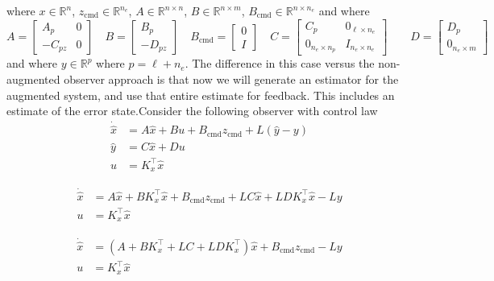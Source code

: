 where $x\in\mathbb{R}^{n}$, $z_{\text{cmd}}\in\mathbb{R}^{n_{e}}$, $A\in\mathbb{R}^{n\times n}$, $B\in\mathbb{R}^{n\times m}$, $B_{\text{cmd}}\in\mathbb{R}^{n\times n_{e}}$ and where
\begin{equation*}
  A=
  \begin{bmatrix}
    A_{p} & 0 \\
    -C_{pz} & 0
  \end{bmatrix}
  \quad
  B=
  \begin{bmatrix}
    B_{p} \\
    -D_{pz}
  \end{bmatrix}
  \quad
  B_{\text{cmd}}=
  \begin{bmatrix}
    0 \\
    I
  \end{bmatrix}
  \quad
  C=
  \begin{bmatrix}
    C_{p} & 0_{\ell\times n_{e}} \\
    0_{n_{e}\times n_{p}} & I_{n_{e}\times n_{e}}
  \end{bmatrix}
  \qquad
  D=
  \begin{bmatrix}
    D_{p} \\
    0_{n_{e}\times m}
  \end{bmatrix}
\end{equation*}
and where $y\in\mathbb{R}^{p}$ where $p=\ell+n_{e}$.
The difference in this case versus the non-augmented observer approach is that now we will generate an estimator for the augmented system, and use that entire estimate for feedback.
This includes an estimate of the error state.Consider the following observer with control law
\begin{equation*}
  \begin{split}
    \dot{\hat{x}}&=A\hat{x}+Bu+B_{\text{cmd}}z_{\text{cmd}}+L(\hat{y}-y) \\
    \hat{y}&=C\hat{x}+Du \\
    u&=K_{x}^{\top}\hat{x}
  \end{split}
\end{equation*}

\begin{equation*}
  \begin{split}
    \dot{\hat{x}}&=A\hat{x}+BK_{x}^{\top}\hat{x}+B_{\text{cmd}}z_{\text{cmd}}+LC\hat{x}+LDK_{x}^{\top}\hat{x}-Ly \\
    u&=K_{x}^{\top}\hat{x}
  \end{split}
\end{equation*}

\begin{equation*}
  \begin{split}
    \dot{\hat{x}}&=(A+BK_{x}^{\top}+LC+LDK_{x}^{\top})\hat{x}+B_{\text{cmd}}z_{\text{cmd}}-Ly \\
    u&=K_{x}^{\top}\hat{x}
  \end{split}
\end{equation*}


